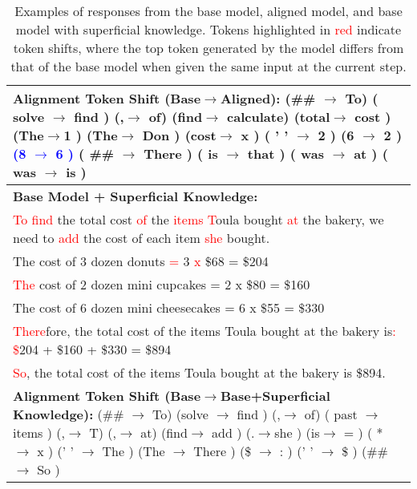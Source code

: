 \begin{table*}[t]
\begin{center}
\begin{small}
\begin{tabular}{|p{13.5cm}|}
\midrule
\textbf{Alignment Token Shift (Base$\rightarrow$Aligned):} (\#\# $\rightarrow$ To)  ( solve $\rightarrow$ find )  (,$\rightarrow$ of) (find$\rightarrow$ calculate)  (total$\rightarrow$ cost ) (The$\rightarrow$1 ) (The$\rightarrow$ Don ) (cost$\rightarrow$ x ) ( ' ' $\rightarrow$ 2 ) (6 $\rightarrow$ 2 ) \textcolor{blue}{(8 $\rightarrow$ 6 )} ( \#\# $\rightarrow$ There ) ( is $\rightarrow$ that ) ( was $\rightarrow$ at ) ( was $\rightarrow$ is ) \\
\midrule
\textbf{Base Model + Superficial Knowledge:}\\
\textcolor{red}{To find} the total cost \textcolor{red}{of} the \textcolor{red}{items T}oula bought \textcolor{red}{at} the bakery, we need to \textcolor{red}{add} the cost of each item \textcolor{red}{she} bought.\\
The cost of 3 dozen donuts \textcolor{red}{=} 3 \textcolor{red}{x} \$68 = \$204 \\
\textcolor{red}{The} cost of 2 dozen mini cupcakes = 2 x \$80 = \$160 \\
The cost of 6 dozen mini cheesecakes = 6 x \$55 = \$330 \\
\textcolor{red}{There}fore, the total cost of the items Toula bought at the bakery is\textcolor{red}{: \$}204 + \$160 + \$330 = \$894 \\
\textcolor{red}{So}, the total cost of the items Toula bought at the bakery is \$894. \\
\midrule
\textbf{Alignment Token Shift (Base$\rightarrow$Base+Superficial Knowledge):} (\#\# $\rightarrow$ To)  (solve $\rightarrow$ find )  (,$\rightarrow$ of)  ( past $\rightarrow$ items )  (,$\rightarrow$ T) (,$\rightarrow$ at)  (find$\rightarrow$ add ) (.$\rightarrow$she ) (is$\rightarrow$ = )  ( * $\rightarrow$ x ) (' ' $\rightarrow$ The ) (The $\rightarrow$ There ) (\$ $\rightarrow$ : ) (' ' $\rightarrow$ \$ ) (\#\# $\rightarrow$ So )  \\
\bottomrule
\end{tabular}
\end{small}
\end{center}
\caption{Examples of responses from the base model, aligned model, and base model with superficial knowledge. Tokens highlighted in \textcolor{red}{red} indicate token shifts, where the top token generated by the model differs from that of the base model when given the same input at the current step.}\label{tab:example1}
\end{table*}

